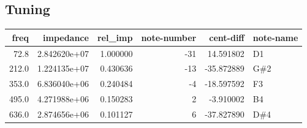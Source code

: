 \documentclass{article}
\begin{document}
\subsection{Tuning}
\begin{centering}
\begin{tabular}{rrrrrl}
\toprule
 freq &    impedance &  rel\_imp &  note-number &  cent-diff & note-name \\
\midrule
 72.8 & 2.842620e+07 & 1.000000 &          -31 &  14.591802 &        D1 \\
212.0 & 1.224135e+07 & 0.430636 &          -13 & -35.872889 &       G\#2 \\
353.0 & 6.836040e+06 & 0.240484 &           -4 & -18.597592 &        F3 \\
495.0 & 4.271988e+06 & 0.150283 &            2 &  -3.910002 &        B4 \\
636.0 & 2.874656e+06 & 0.101127 &            6 & -37.827890 &       D\#4 \\
\bottomrule
\end{tabular}
\end{centering}
\end{document}
